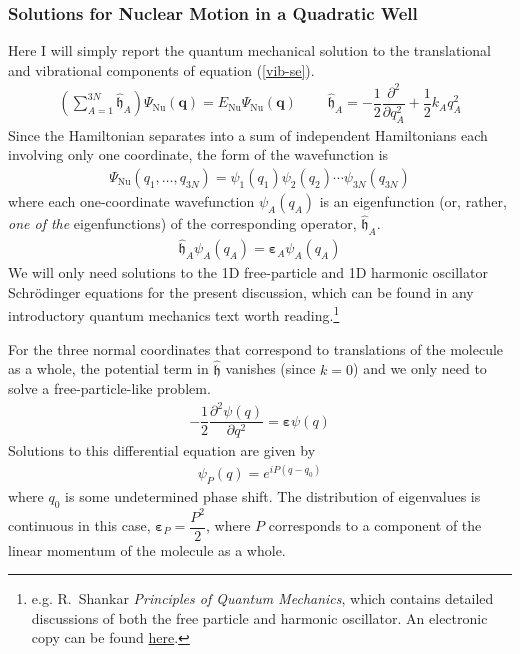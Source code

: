 \documentclass[11pt]{article}
\newcommand{\bo}[1]{\ensuremath{\mathbf{#1}}}
\renewcommand{\sp}{\ \ \ \ \ \ \ \ \ \ }
\newcommand{\fr}[2]{\dfrac{#1}{#2}}
\newcommand{\pr}[1]{\left(#1\right)}
\newcommand{\pd}[3]{\ensuremath{ \dfrac{ \partial^{#1} #2 }{\partial #3 ^{#1}}}}
\newcommand{\ld}{\ensuremath{\ldots}}
\newcommand{\Nu}{\ensuremath{\mathrm{Nu}}}
\newcommand{\op}[1]{\ensuremath{\hat{#1}}}
\newcommand{\Y}{\ensuremath{\Psi}}
\newcommand{\y}{\ensuremath{\psi}}
\newcommand{\mf}[1]{\ensuremath{\mathfrak{#1}}}
\newcommand{\e}{\ensuremath{\bm\varepsilon}}
\begin{document}
\subsubsection*{Solutions for Nuclear Motion in a Quadratic Well}
Here I will simply report the quantum mechanical solution to the translational
and vibrational components of equation (\ref{vib-se}).
\begin{align*}
\pr{\sum_{A=1}^{3N}
    \op{\mf{h}}_A }
    \Y_\Nu(\bo{q})
=
    E_\Nu
    \Y_\Nu(\bo{q})
\sp
    \op{\mf{h}}_A
=
-\fr{1}{2}
    \pd{2}{}{q_A}
+\fr{1}{2}
    k_A q_A^2
\end{align*}
Since the Hamiltonian separates into a sum of independent Hamiltonians each
involving only one coordinate, the form of the wavefunction is
\begin{align}
    \Y_\Nu(q_1,\ld,q_{3N})
=
    \y_1(q_1)
    \y_2(q_2)
    \cdots
    \y_{3N}(q_{3N})
\end{align}
where each one-coordinate wavefunction $\y_A(q_A)$ is an eigenfunction (or,
rather, {\it one of the} eigenfunctions) of the corresponding operator,
$\op{\mf{h}}_A$.
\begin{align}
    \op{\mf{h}}_A
    \y_A(q_A)
=
    \e_A
    \y_A(q_A)
\end{align}
We will only need solutions to the 1D free-particle and 1D harmonic oscillator
Schr\"odinger equations for the present discussion, which can be found in any
introductory quantum mechanics text worth reading.\footnote{e.g. R.\ Shankar
{\it Principles of Quantum Mechanics}, which contains detailed discussions of
both the free particle and harmonic oscillator. An electronic copy can be found
\href{http://home.basu.ac.ir/\~psu/Books/\%5BRamamurti_Shankar\%5D_Principles_of_Quantum_Mechanic\%28BookFi.org\%29.pdf}{here}.}

For the three normal coordinates that correspond to translations of the
molecule as a whole, the potential term in $\op{\mf{h}}$ vanishes (since
$k=0$) and we only need to solve a free-particle-like problem.
\begin{align}
-\fr{1}{2}
    \pd{2}{\y(q)}{q}
=
    \e
    \y(q)
\end{align}
Solutions to this differential equation are given by
\begin{align}
    \y_{P}(q)
=
    e^{iP(q-q_0)}
\end{align}
where $q_0$ is some undetermined phase shift. The distribution of
eigenvalues is continuous in this case, $\e_{P}=\fr{P^2}{2}$, where $P$
corresponds to a component of the linear momentum of the molecule as a whole.
\end{document}

